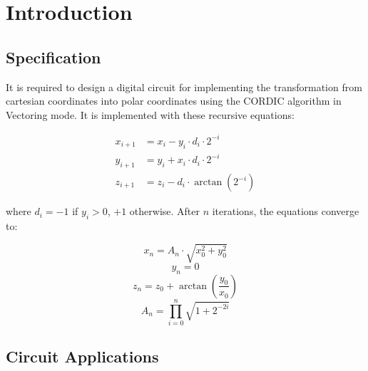 \chapter{Introduction}

\section{Specification}

It is required to design a digital circuit for implementing the transformation from cartesian coordinates into polar coordinates using the CORDIC algorithm in Vectoring mode. It is implemented
with these recursive equations:

\begin{align*}
    x_{i+1} & = x_i - y_i \cdot d_i \cdot 2^{-i} \\
    y_{i+1} & = y_i + x_i \cdot d_i \cdot 2^{-i} \\
    z_{i+1} & = z_i - d_i \cdot \arctan(2^{-i})
\end{align*}

where \(d_i = -1\) if \(y_i > 0\), \(+1\) otherwise. After \(n\) iterations, the equations converge to:

\[
    x_n = A_n \cdot \sqrt{x_0^2 + y_0^2}
\]
\[
    y_n = 0
\]
\[
    z_n = z_0 + \arctan\left(\frac{y_0}{x_0}\right)
\]
\[
    A_n = \prod_{i=0}^n \sqrt{1 + 2^{-2i}}
\]


\section{Circuit Applications}